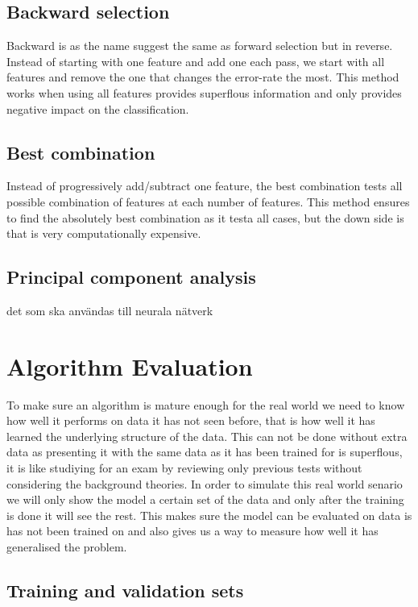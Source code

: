 \subsection{Backward selection}

Backward is as the name suggest the same as forward selection but in reverse. Instead of starting with one feature and add one each pass, we start with all features and remove the one that changes the error-rate the most. This method works when using all features provides superflous information and only provides negative impact on the classification.

\subsection{Best combination}

Instead of progressively add/subtract one feature, the best combination tests all possible combination of features at each number of features. This method ensures to find the absolutely best combination as it testa all cases, but the down side is that is very computationally expensive.

\subsection{Principal component analysis}

det som ska användas till neurala nätverk

\section{Algorithm Evaluation}

To make sure an algorithm is mature enough for the real world we need to know how well it performs on data it has not seen before, that is how well it has learned the underlying structure of the data. This can not be done without extra data as presenting it with the same data as it has been trained for is superflous, it is like studiying for an exam by reviewing only previous tests without considering the background theories. In order to simulate this real world senario we will only show the model a certain set of the data and only after the training is done it will see the rest. This makes sure the model can be evaluated on data is has not been trained on and also gives us a way to measure how well it has generalised the problem.

\subsection{Training and validation sets}

